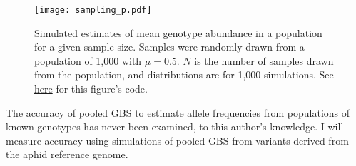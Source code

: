 \begin{figure}[!ht]
    \centering
    \texttt{[image: sampling\_p.pdf]}
    \caption{Simulated estimates of mean genotype abundance in a population for a given
        sample size. Samples were randomly drawn from a population of 1,000 with 
        $\mu = 0.5$. $N$ is the number of samples drawn from the population, and 
        distributions are for 1,000 simulations.
        See \href{https://github.com/lucasnell/mol_ecol/blob/master/samp_plot.R}{here} 
        for this figure's code.}
    \label{fig:sampling}
\end{figure}



The accuracy of pooled GBS to estimate allele frequencies from populations of known
genotypes has never been examined, to this author's knowledge.
I will measure accuracy using simulations of pooled GBS from variants derived from the 
aphid reference genome.








